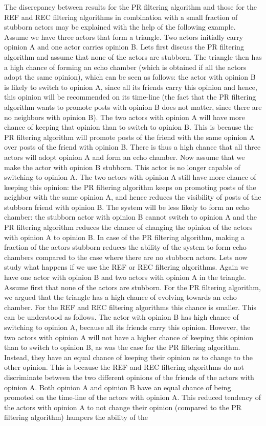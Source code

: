 \documentclass[11 pt , letterpaper , twoside , openright]{book}
\begin{document}
\newline
The discrepancy between results for the PR filtering algorithm and those for the REF and REC filtering algorithms in combination with a small fraction of stubborn actors may be explained with the help of the following example. Assume we have three actors that form a triangle. Two actors initially carry opinion A and one actor carries opinion B. Lets first discuss the PR filtering algorithm and assume that none of the actors are stubborn. The triangle then has a high chance of forming an echo chamber (which is obtained if all the actors adopt the same opinion), which can be seen as follows: the actor with opinion B is likely to switch to opinion A, since all its friends carry this opinion and hence, this opinion will be recommended on its time-line (the fact that the PR filtering algorithm wants to promote posts with opinion B does not matter, since there are no neighbors with opinion B). The two actors with opinion A will have more chance of keeping that opinion than to switch to opinion B. This is because the PR filtering algorithm will promote posts of the friend with the same opinion A over posts of the friend with opinion B. There is thus a high chance that all three actors will adopt opinion A and form an echo chamber. Now assume that we make the actor with opinion B stubborn. This actor is no longer capable of switching to opinion A. The two actors with opinion A still have more chance of keeping this opinion: the PR filtering algorithm keeps on promoting posts of the neighbor with the same opinion A, and hence reduces the visibility of posts of the stubborn friend with opinion B. The system will be less likely to form an echo chamber: the stubborn actor with opinion B cannot switch to opinion A and the PR filtering algorithm reduces the chance of changing the opinion of the actors with opinion A to opinion B. In case of the PR filtering algorithm, making a fraction of the actors stubborn reduces the ability of the system to form echo chambers compared to the case where there are no stubborn actors. Lets now study what happens if we use the REF or REC filtering algorithms. Again we have one actor with opinion B and two actors with opinion A in the triangle. Assume first that none of the actors are stubborn. For the PR filtering algorithm, we argued that the triangle has a high chance of evolving towards an echo chamber. For the REF and REC filtering algorithms this chance is smaller. This can be understood as follows. The actor with opinion B has high chance of switching to opinion A, because all its friends carry this opinion. However, the two actors with opinion A will not have a higher chance of keeping this opinion than to switch to opinion B, as was the case for the PR filtering algorithm. Instead, they have an equal chance of keeping their opinion as to change to the other opinion. This is because the REF and REC filtering algorithms do not discriminate between the two different opinions of the friends of the actors with opinion A. Both opinion A and opinion B have an equal chance of being promoted on the time-line of the actors with opinion A. This reduced tendency of the actors with opinion A to not change their opinion (compared to the PR filtering algorithm) hampers the ability of the 
\end{document}
